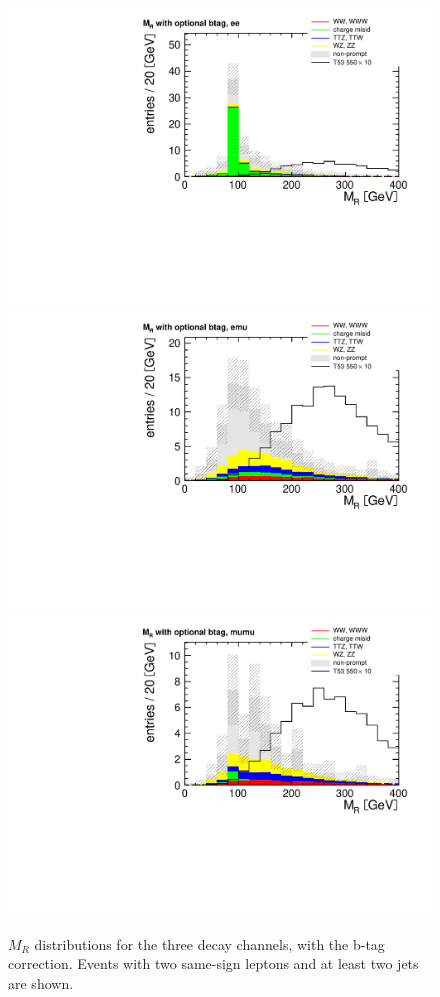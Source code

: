 \begin{figure}[htb]
    \centering
    \includegraphics[width=.7\textwidth]{images/pdf/mr_optional_btag_ee_0}
    \includegraphics[width=.7\textwidth]{images/pdf/mr_optional_btag_emu_0}
    \includegraphics[width=.7\textwidth]{images/pdf/mr_optional_btag_mumu_0}
    \caption{$M_R$ distributions for the three decay channels,
        with the b-tag correction. Events with two same-sign leptons and at least
two jets are shown.}
    \label{fig:mr_optional_btag_app}
\end{figure}

